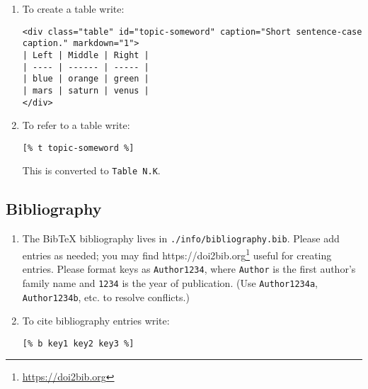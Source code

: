 \documentclass{scrbook}
\newcommand{\hreffoot}[2]{{#1}\footnote{\href{#2}{#2}}}
\begin{document}
\begin{enumerate}

\item 

To create a table write:

\begin{lstlisting}[frame=single,frameround=tttt]
<div class="table" id="topic-someword" caption="Short sentence-case caption." markdown="1">
| Left | Middle | Right |
| ---- | ------ | ----- |
| blue | orange | green |
| mars | saturn | venus |
</div>
\end{lstlisting}



\item 

To refer to a table write:

\begin{lstlisting}[frame=single,frameround=tttt]
[% t topic-someword %]
\end{lstlisting}


This is converted to \texttt{Table N.K}.



\end{enumerate}

\subsection*{Bibliography}

\begin{enumerate}

\item 

The BibTeX bibliography lives in \texttt{./info/bibliography.bib}.
    Please add entries as needed;
    you may find \hreffoot{https://doi2bib.org}{https://doi2bib.org} useful for creating entries.
    Please format keys as \texttt{Author1234},
    where \texttt{Author} is the first author's family name
    and \texttt{1234} is the year of publication.
    (Use \texttt{Author1234a}, \texttt{Author1234b}, etc. to resolve conflicts.)



\item 

To cite bibliography entries write:

\begin{lstlisting}[frame=single,frameround=tttt]
[% b key1 key2 key3 %]
\end{lstlisting}



\end{enumerate}
\end{document}
